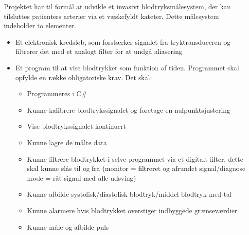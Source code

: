 Projektet har til formål at udvikle et invasivt blodtryksmålesystem, der kan tilsluttes patienters arterier via et væskefyldt kateter. Dette målesystem indeholder to elementer.

\begin{itemize}
	\item Et elektronisk kredsløb, som forstærker signalet fra tryktransduceren og filtrerer det med et analogt filter for at undgå aliasering	
	\item Et program til at vise blodtrykket som funktion af tiden. Programmet skal opfylde en række obligatoriske krav. Det skal:
	\begin{itemize}
		\item Programmeres i C\#
		\item Kunne kalibrere blodtrykssignalet og foretage en nulpunktsjustering
		\item Vise blodtrykssignalet kontinuert
		\item Kunne lagre de målte data
		\item Kunne filtrere blodtrykket i selve programmet via et digitalt filter, dette skal kunne slås til og fra (monitor = filtreret og afrundet signal/diagnose mode = råt signal med alle udsving)
		\item Kunne afbilde systolisk/diastolisk blodtryk/middel blodtryk med tal
		\item Kunne alarmere hvis blodtrykket overstiger indbyggede grænseværdier
		\item Kunne måle og afbilde puls
	\end{itemize}	
\end{itemize}

